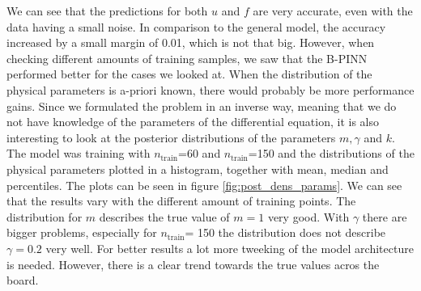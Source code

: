 \documentclass{article}
\newcommand{\nt}{$n_\text{train}$}
\begin{document}
We can see that the predictions for both $u$ and $f$ are very accurate, even with the data having a small noise. In comparison to the general model, the accuracy increased by a small margin of 0.01, which is not that big. However, when checking different amounts of training samples, we saw that the B-PINN performed better for the cases we looked at. When the distribution of the physical parameters is a-priori known, there would probably be more performance gains. Since we formulated the problem in an inverse way, meaning that we do not have knowledge of the parameters of the differential equation, it is also interesting to look at the posterior distributions of the parameters $m, \gamma$ and $k$. The model was training with \nt=60 and \nt=150 and the distributions of the physical parameters plotted in a histogram, together with mean, median and percentiles. The plots can be seen in figure \ref{fig:post_dens_params}. We can see that the results vary with the different amount of training points. The distribution for $m$ describes the true value of $m=1$ very good. With $\gamma$ there are bigger problems, especially for \nt = 150 the distribution does not describe $\gamma=0.2$ very well. For better results a lot more tweeking of the model architecture is needed. However, there is a clear trend towards the true values acros the board.
\end{document}
